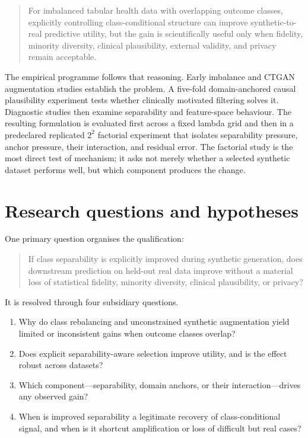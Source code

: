 \begin{quote}
For imbalanced tabular health data with overlapping outcome classes, explicitly controlling class-conditional structure can improve synthetic-to-real predictive utility, but the gain is scientifically useful only when fidelity, minority diversity, clinical plausibility, external validity, and privacy remain acceptable.
\end{quote}

The empirical programme follows that reasoning. Early imbalance and CTGAN augmentation studies establish the problem. A five-fold domain-anchored causal plausibility experiment tests whether clinically motivated filtering solves it. Diagnostic studies then examine separability and feature-space behaviour. The resulting \sepa{} formulation is evaluated first across a fixed lambda grid and then in a predeclared replicated $2^2$ factorial experiment that isolates separability pressure, anchor pressure, their interaction, and residual error. The factorial study is the most direct test of mechanism; it asks not merely whether a selected synthetic dataset performs well, but which component produces the change.

\section{Research questions and hypotheses}

One primary question organises the qualification:

\begin{quote}
If class separability is explicitly improved during synthetic generation, does downstream prediction on held-out real data improve without a material loss of statistical fidelity, minority diversity, clinical plausibility, or privacy?
\end{quote}

It is resolved through four subsidiary questions.

\begin{enumerate}[label=\textbf{RQ\arabic*:},leftmargin=*]
\item Why do class rebalancing and unconstrained synthetic augmentation yield limited or inconsistent gains when outcome classes overlap?
\item Does explicit separability-aware selection improve \tstr{} utility, and is the effect robust across datasets?
\item Which component---separability, domain anchors, or their interaction---drives any observed gain?
\item When is improved separability a legitimate recovery of class-conditional signal, and when is it shortcut amplification or loss of difficult but real cases?
\end{enumerate}

